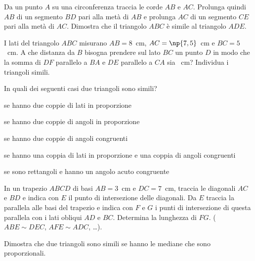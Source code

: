 \begin{multicols}{2}
\begin{esercizio}
\label{ese:6.78}
Da un punto $A$ su una circonferenza traccia le corde $AB$ e $AC$. Prolunga quindi $AB$ di un segmento $BD$ pari alla metà di $AB$ e prolunga $AC$ di un segmento $CE$ pari alla metà di $AC$. Dimostra che il triangolo $ABC$ è simile al triangolo $ADE$.
\end{esercizio}

\begin{esercizio}
\label{ese:6.79}
I lati del triangolo $ABC$ misurano $AB=8$~cm, $AC=\np{7,5}$~cm e $BC=5$~cm. A che distanza da $B$ bisogna prendere sul lato $BC$ un punto $D$ in modo che la somma di $DF$ parallelo a $BA$ e $DE$ parallelo a $CA$ sia ~cm? Individua i triangoli simili.
\end{esercizio}

\begin{esercizio}
\label{ese:6.80}
In quali dei seguenti casi due triangoli sono simili?
\begin{enumeratea}
\item se hanno due coppie di lati in proporzione\tab\hfill\boxV\quad\boxF
\item se hanno due coppie di angoli in proporzione\tab\hfill\boxV\quad\boxF
\item se hanno due coppie di angoli congruenti\tab\hfill\boxV\quad\boxF
\item se hanno una coppia di lati in proporzione e una coppia di angoli congruenti\tab\hfill\boxV\quad\boxF
\item se sono rettangoli e hanno un angolo acuto congruente\hfill\boxV\quad\boxF
\end{enumeratea}
\end{esercizio}

\begin{esercizio}
\label{ese:6.81}
In un trapezio $ABCD$ di basi $AB=3$~cm e $DC=7$~cm, traccia le diagonali $AC$ e $BD$ e indica con $E$ il punto di intersezione delle diagonali. Da $E$ traccia la parallela alle basi del trapezio e indica con $F$ e $G$ i punti di intersezione di questa parallela con i lati obliqui $AD$ e $BC$. Determina la lunghezza di $FG$. ($ABE\sim DEC$, $AFE\sim ADC$, \ldots).
\end{esercizio}

\begin{esercizio}
\label{ese:6.82}
Dimostra che due triangoli sono simili se hanno le mediane che sono proporzionali.
\end{esercizio}


\end{multicols}
